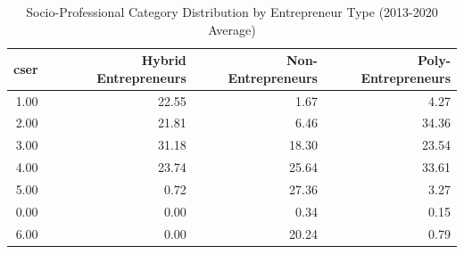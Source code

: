 \begin{table}[ht]
\centering
\caption{Socio-Professional Category Distribution by Entrepreneur Type (2013-2020 Average)} 
\label{tab:characteristics_sociopro_avg}
\begin{tabular}{rrrr}
  \toprule
cser & Hybrid Entrepreneurs & Non-Entrepreneurs & Poly-Entrepreneurs \\ 
  \midrule
1.00 & 22.55 & 1.67 & 4.27 \\ 
  2.00 & 21.81 & 6.46 & 34.36 \\ 
  3.00 & 31.18 & 18.30 & 23.54 \\ 
  4.00 & 23.74 & 25.64 & 33.61 \\ 
  5.00 & 0.72 & 27.36 & 3.27 \\ 
  0.00 & 0.00 & 0.34 & 0.15 \\ 
  6.00 & 0.00 & 20.24 & 0.79 \\ 
   \bottomrule
\end{tabular}
\end{table}
